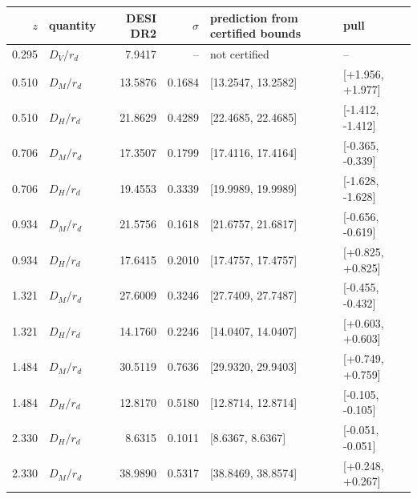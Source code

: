 \begin{tabular}{@{}rlrrll@{}}\toprule
$z$ & quantity & DESI DR2 & $\sigma$ & prediction from certified bounds & pull \\
\midrule
0.295 & $D_V/r_d$ & 7.9417 & -- & not certified & -- \\
0.510 & $D_M/r_d$ & 13.5876 & 0.1684 & [13.2547, 13.2582] & [+1.956, +1.977] \\
0.510 & $D_H/r_d$ & 21.8629 & 0.4289 & [22.4685, 22.4685] & [-1.412, -1.412] \\
0.706 & $D_M/r_d$ & 17.3507 & 0.1799 & [17.4116, 17.4164] & [-0.365, -0.339] \\
0.706 & $D_H/r_d$ & 19.4553 & 0.3339 & [19.9989, 19.9989] & [-1.628, -1.628] \\
0.934 & $D_M/r_d$ & 21.5756 & 0.1618 & [21.6757, 21.6817] & [-0.656, -0.619] \\
0.934 & $D_H/r_d$ & 17.6415 & 0.2010 & [17.4757, 17.4757] & [+0.825, +0.825] \\
1.321 & $D_M/r_d$ & 27.6009 & 0.3246 & [27.7409, 27.7487] & [-0.455, -0.432] \\
1.321 & $D_H/r_d$ & 14.1760 & 0.2246 & [14.0407, 14.0407] & [+0.603, +0.603] \\
1.484 & $D_M/r_d$ & 30.5119 & 0.7636 & [29.9320, 29.9403] & [+0.749, +0.759] \\
1.484 & $D_H/r_d$ & 12.8170 & 0.5180 & [12.8714, 12.8714] & [-0.105, -0.105] \\
2.330 & $D_H/r_d$ & 8.6315 & 0.1011 & [8.6367, 8.6367] & [-0.051, -0.051] \\
2.330 & $D_M/r_d$ & 38.9890 & 0.5317 & [38.8469, 38.8574] & [+0.248, +0.267] \\
\bottomrule
\end{tabular}
